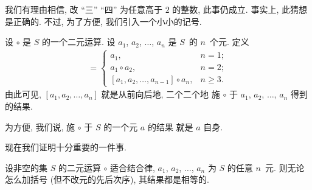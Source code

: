 \documentclass[%
    UTF8,%
    fontset=none,%
    punct=kaiming,%
    zihao=-4,%
    a4paper,%
    oneside,%
]{ctexbook}
\renewcommand*{\geq}{\geqslant}
\begin{document}
我们有理由相信,
改 ``三'' ``四'' 为任意高于 \(2\) 的整数,
此事仍成立.
事实上, 此猜想是正确的.
不过, 为了方便, 我们引入一个小小的记号.

\begin{definition}
    设 \(\circ\) 是 \(S\) 的一个二元运算.
    设 \(a_1\), \(a_2\), \(\dots\), \(a_n\) 是
    \(S\)~的 \(n\)~个元.
    定义
    \begin{align*}
        [a_1, a_2, \dots, a_n]
        =
        \begin{cases}
            a_1,
             & n = 1;    \\
            a_1 \circ a_2,
             & n = 2;    \\
            [a_1, a_2, \dots, a_{n-1}] \circ a_n,
             & n \geq 3.
        \end{cases}
    \end{align*}
    由此可见, \([a_1, a_2, \dots, a_n]\)
    就是从前向后地, 二个二个地%
    施 \(\circ\) 于
    \(a_1\), \(a_2\), \(\dots\), \(a_n\)
    得到的结果.
\end{definition}

为方便, 我们说,
施 \(\circ\) 于 \(S\) 的一个元 \(a\) 的结果%
就是 \(a\) 自身.

现在我们证明十分重要的一件事.

\begin{theorem}
    设非空的集 \(S\) 的二元运算 \(\circ\) 适合结合律,
    \(a_1\), \(a_2\), \(\dots\), \(a_n\) 为 \(S\) 的任意 \(n\)~元.
    则无论怎么加括号
    (但不改元的先后次序),
    其结果都是相等的.
\end{theorem}
\end{document}
